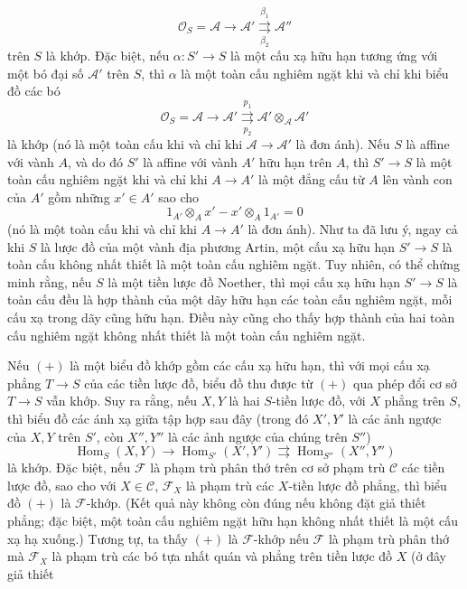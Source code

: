 \[
  \mathcal O_S=\mathcal A\longrightarrow\mathcal A'
  \overset{\beta_1}{\underset{\beta_2}{\rightrightarrows}}\mathcal A''
\]
trên $S$ là khớp. Đặc biệt, nếu $\alpha:S'\longrightarrow S$ là một cấu xạ
hữu hạn tương ứng với một bó đại số $\mathcal A'$ trên $S$, thì $\alpha$ là
một toàn cấu nghiêm ngặt khi và chỉ khi biểu đồ các bó
\[
  \mathcal O_S=\mathcal A\longrightarrow\mathcal A'
  \overset{p_1}{\underset{p_2}{\rightrightarrows}}
  \mathcal A'\otimes_{\mathcal A}\mathcal A'
\]
là khớp (nó là một toàn cấu khi và chỉ khi
$\mathcal A\longrightarrow\mathcal A'$ là đơn ánh). Nếu $S$ là affine với
vành $A$, và do đó $S'$ là affine với vành $A'$ hữu hạn trên $A$, thì
$S'\longrightarrow S$ là một toàn cấu nghiêm ngặt khi và chỉ khi
$A\longrightarrow A'$ là một đẳng cấu từ $A$ lên vành con của $A'$ gồm những
$x'\in A'$ sao cho
\[
  1_{A'}\otimes_Ax'-x'\otimes_A1_{A'}=0
\]
(nó là một toàn cấu khi và chỉ khi $A\longrightarrow A'$ là đơn ánh). Như ta
đã lưu ý, ngay cả khi $S$ là lược đồ của một vành địa phương Artin, một cấu xạ
hữu hạn $S'\longrightarrow S$ là toàn cấu không nhất thiết là một toàn cấu
nghiêm ngặt. Tuy nhiên, có thể chứng minh rằng, nếu $S$ là một tiền lược đồ
Noether, thì mọi cấu xạ hữu hạn $S'\longrightarrow S$ là toàn cấu đều là hợp
thành của một dãy hữu hạn các toàn cấu nghiêm ngặt, mỗi cấu xạ trong dãy cũng
hữu hạn. Điều này cũng cho thấy hợp thành của hai toàn cấu nghiêm ngặt không
nhất thiết là một toàn cấu nghiêm ngặt.

 Nếu $(+)$ là một biểu đồ khớp gồm các cấu xạ hữu hạn, thì với mọi
cấu xạ phẳng $T\longrightarrow S$ của các tiền lược đồ, biểu đồ thu được từ
$(+)$ qua phép đổi cơ sở $T\longrightarrow S$ vẫn khớp. Suy ra rằng, nếu $X,Y$
là hai $S$-tiền lược đồ, với $X$ phẳng trên $S$, thì biểu đồ các ánh xạ giữa
tập hợp sau đây (trong đó $X',Y'$ là các ảnh ngược của $X,Y$ trên $S'$, còn
$X'',Y''$ là các ảnh ngược của chúng trên $S''$)
\[
  \operatorname{Hom}_S(X,Y)\longrightarrow
  \operatorname{Hom}_{S'}(X',Y')
  \rightrightarrows
  \operatorname{Hom}_{S''}(X'',Y'')
\]
là khớp. Đặc biệt, nếu $\mathcal F$ là phạm trù phân thớ trên cơ sở phạm trù
$\mathcal C$ các tiền lược đồ, sao cho với $X\in\mathcal C$, $\mathcal F_X$
là phạm trù các $X$-tiền lược đồ phẳng, thì biểu đồ $(+)$ là
$\mathcal F$-khớp. (Kết quả này không còn đúng nếu không đặt giả thiết phẳng;
đặc biệt, một toàn cấu nghiêm ngặt hữu hạn không nhất thiết là một cấu xạ hạ
xuống.) Tương tự, ta thấy $(+)$ là $\mathcal F$-khớp nếu $\mathcal F$ là phạm
trù phân thớ mà $\mathcal F_X$ là phạm trù các bó tựa nhất quán và phẳng trên
tiền lược đồ $X$ (ở đây giả thiết

